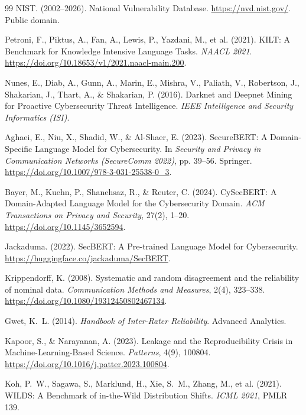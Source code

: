 \documentclass{article}
\begin{document}
\begin{thebibliography}{99}
NIST. (2002--2026). National Vulnerability Database.
\url{https://nvd.nist.gov/}. Public domain.

Petroni, F., Piktus, A., Fan, A., Lewis, P., Yazdani, M., et al.
(2021). KILT: A Benchmark for Knowledge Intensive Language Tasks.
\textit{NAACL 2021}. \url{https://doi.org/10.18653/v1/2021.naacl-main.200}.

Nunes, E., Diab, A., Gunn, A., Marin, E., Mishra, V.,
Paliath, V., Robertson, J., Shakarian, J., Thart, A., \&
Shakarian, P. (2016). Darknet and Deepnet Mining for Proactive
Cybersecurity Threat Intelligence. \textit{IEEE Intelligence and
Security Informatics (ISI)}.

Aghaei, E., Niu, X., Shadid, W., \& Al-Shaer, E. (2023). SecureBERT: A Domain-Specific Language Model for Cybersecurity. In \textit{Security and Privacy in Communication Networks (SecureComm 2022)}, pp. 39--56. Springer. \url{https://doi.org/10.1007/978-3-031-25538-0_3}.

Bayer, M., Kuehn, P., Shanehsaz, R., \& Reuter, C. (2024). CySecBERT: A Domain-Adapted Language Model for the Cybersecurity Domain. \textit{ACM Transactions on Privacy and Security}, 27(2), 1--20. \url{https://doi.org/10.1145/3652594}.

Jackaduma. (2022). SecBERT: A Pre-trained Language Model
for Cybersecurity. \url{https://huggingface.co/jackaduma/SecBERT}.

Krippendorff, K. (2008). Systematic and random disagreement and the
reliability of nominal data. \textit{Communication Methods and Measures},
2(4), 323--338. \url{https://doi.org/10.1080/19312450802467134}.

Gwet, K.\ L. (2014). \textit{Handbook of Inter-Rater Reliability}.
Advanced Analytics.

Kapoor, S., \& Narayanan, A. (2023). Leakage and the Reproducibility
Crisis in Machine-Learning-Based Science. \textit{Patterns}, 4(9),
100804. \url{https://doi.org/10.1016/j.patter.2023.100804}.

Koh, P.\ W., Sagawa, S., Marklund, H., Xie, S.\ M., Zhang, M.,
et al. (2021). WILDS: A Benchmark of in-the-Wild Distribution Shifts.
\textit{ICML 2021}, PMLR 139.


\end{thebibliography}
\end{document}
